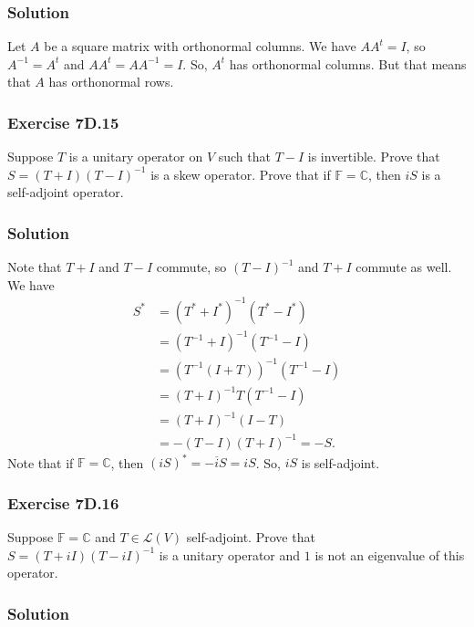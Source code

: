 \subsubsection*{Solution}

Let $A$ be a square matrix with orthonormal columns.
We have $AA^t = I$, so $A^{-1} = A^t$ and $AA^t = AA^{-1} = I$.
So, $A^t$ has orthonormal columns.
But that means that $A$ has orthonormal rows.


\subsubsection*{Exercise 7D.15}

Suppose $T$ is a unitary operator on $V$ such that $T - I$ is invertible.
Prove that $S = (T + I)(T - I)^{-1}$ is a skew operator.
Prove that if $\mathbb{F} = \mathbb{C}$, then $iS$ is a self-adjoint operator.


\subsubsection*{Solution}

Note that $T + I$ and $T - I$ commute, so $(T - I)^{-1}$ and $T + I$ commute as well.
We have
\begin{equation*}
    \begin{split}
        S^* &= (T^* + I^*)^{-1}(T^* - I^*) \\
            &= (T^{-1} + I)^{-1}(T^{-1} - I) \\
            &= (T^{-1}(I + T))^{-1}(T^{-1} - I) \\
            &= (T + I)^{-1} T(T^{-1} - I) \\
            &= (T + I)^{-1} (I - T) \\
            &= - (T - I)(T + I)^{-1} = -S.
    \end{split}
\end{equation*}
Note that if $\mathbb{F} = \mathbb{C}$, then $(iS)^* = -\overline{i}S = iS$.
So, $iS$ is self-adjoint.


\subsubsection*{Exercise 7D.16}

Suppose $\mathbb{F} = \mathbb{C}$ and $T \in \mathcal{L}(V)$ self-adjoint.
Prove that $S = (T + iI)(T - iI)^{-1}$ is a unitary operator and $1$ is not an eigenvalue of this operator.

\subsubsection*{Solution}

